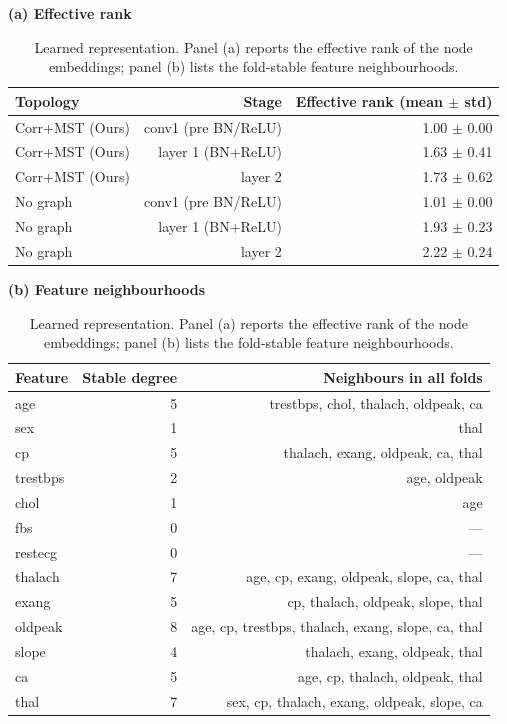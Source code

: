 \begin{table}[t]
\centering
\caption{Learned representation. Panel (a) reports the effective rank of the node embeddings; panel (b) lists the fold-stable feature neighbourhoods.}
\label{tab:rank}
\label{tab:neighbourhoods}
\footnotesize
\textbf{(a) Effective rank}\\[2pt]
\begin{tabular}{lrr}
\toprule
Topology & Stage & Effective rank (mean $\pm$ std) \\
\midrule
Corr+MST (Ours) & conv1 (pre BN/ReLU) & 1.00 $\pm$ 0.00 \\
Corr+MST (Ours) & layer 1 (BN+ReLU) & 1.63 $\pm$ 0.41 \\
Corr+MST (Ours) & layer 2 & 1.73 $\pm$ 0.62 \\
No graph & conv1 (pre BN/ReLU) & 1.01 $\pm$ 0.00 \\
No graph & layer 1 (BN+ReLU) & 1.93 $\pm$ 0.23 \\
No graph & layer 2 & 2.22 $\pm$ 0.24 \\
\bottomrule
\end{tabular}
\vspace{7pt}
\textbf{(b) Feature neighbourhoods}\\[2pt]
\begin{tabular}{lrr}
\toprule
Feature & Stable degree & Neighbours in all folds \\
\midrule
age & 5 & trestbps, chol, thalach, oldpeak, ca \\
sex & 1 & thal \\
cp & 5 & thalach, exang, oldpeak, ca, thal \\
trestbps & 2 & age, oldpeak \\
chol & 1 & age \\
fbs & 0 & --- \\
restecg & 0 & --- \\
thalach & 7 & age, cp, exang, oldpeak, slope, ca, thal \\
exang & 5 & cp, thalach, oldpeak, slope, thal \\
oldpeak & 8 & age, cp, trestbps, thalach, exang, slope, ca, thal \\
slope & 4 & thalach, exang, oldpeak, thal \\
ca & 5 & age, cp, thalach, oldpeak, thal \\
thal & 7 & sex, cp, thalach, exang, oldpeak, slope, ca \\
\bottomrule
\end{tabular}
\end{table}
